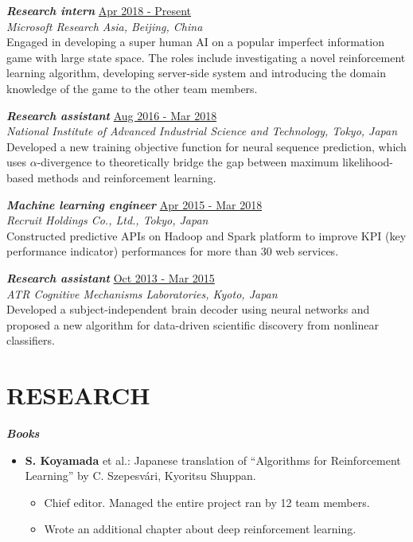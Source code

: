 \documentclass[margin, 10pt]{res} %
\begin{document}
\begin{resume}
{\sl {\bf Research intern}} \hfill {\small \underline{Apr 2018 - Present}} \\
{\it Microsoft Research Asia, Beijing, China} \\
Engaged in developing a super human AI on a popular imperfect information game with large state space. 
The roles include investigating a novel reinforcement learning algorithm, developing server-side system and introducing the domain knowledge of the game to the other team members.

{\sl {\bf Research assistant}} \hfill {\small \underline{Aug 2016 - Mar 2018}} \\
{\it National Institute of Advanced Industrial Science and Technology, Tokyo, Japan} \\
Developed a new training objective function for neural sequence prediction, which uses $\alpha$-divergence to theoretically bridge the gap between maximum likelihood-based methods and reinforcement learning.

{\sl {\bf Machine learning engineer}} \hfill {\small \underline{Apr 2015 - Mar 2018}}\\
{\it Recruit Holdings Co., Ltd., Tokyo, Japan} \\
Constructed predictive APIs on Hadoop and Spark platform to improve KPI (key performance indicator) performances for more than 30 web services.

{\sl {\bf Research assistant}} \hfill {\small \underline{Oct 2013 - Mar 2015}} \\
{\it ATR Cognitive Mechanisms Laboratories, Kyoto, Japan}  \\
Developed a subject-independent brain decoder using neural networks and proposed a new algorithm for data-driven scientific discovery from nonlinear classifiers.

\section{{\small RESEARCH} }
{\sl {\bf Books}} \vspace{0.5em}
\begin{itemize}
\item {\bf S. Koyamada} et al.: Japanese translation of ``Algorithms for Reinforcement Learning'' by C. Szepesv{\'a}ri, Kyoritsu Shuppan.
  \begin{itemize}
  \item Chief editor. Managed the entire project ran by 12 team members.
  \item Wrote an additional chapter about deep reinforcement learning.
  \end{itemize}
\end{itemize}


\end{resume}
\end{document}
